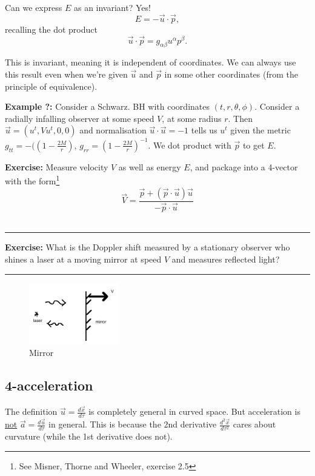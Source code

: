 \documentclass[a4paper]{article} %
\newcommand{\exercise}[2]
{
\begin{framed}
\textbf{Exercise:} #1 \\\hrule
#2
\end{framed}
}
\newcommand{\example}[2]
{
\begin{framed}
\textbf{Example #1:} #2
\end{framed}
}
\begin{document}
Can we express $E$ as an invariant? Yes!
\begin{equation}
E=-\vec{u}\cdot\vec{p},
\end{equation}
recalling the dot product
\begin{equation}
\vec{u}\cdot\vec{p}=g_{\alpha\beta}u^{\alpha}p^{\beta}.
\end{equation}


This is invariant, meaning it is independent of coordinates. We can always use this result even when we're given $\vec{u}$ and $\vec{p}$ in some other coordinates (from the principle of equivalence).

\example{?}{Consider a Schwarz. BH with coordinates $(t,r,\theta,\phi)$. Consider a radially infalling observer at some speed $V$, at some radius $r$. Then $\vec{u}=(u^t,Vu^t,0,0)$ and normalisation $\vec{u}\cdot\vec{u}=-1$ tells us $u^t$ given the metric $g_{tt}=-(\left(1-\frac{2M}{r}\right)$, $g_{rr}=\left(1-\frac{2M}{r}\right)^{-1}$. We dot product with $\vec{p}$ to get $E$.}

\exercise{Measure velocity $V$ as well as energy $E$, and package into a 4-vector with the form\footnote{See Misner, Thorne and Wheeler, exercise 2.5}
\begin{equation}
\vec{V}=\frac{\vec{p}+(\vec{p}\cdot\vec{u})\vec{u}}{-\vec{p}\cdot\vec{u}}
\end{equation}
}{}

\exercise{What is the Doppler shift measured by a stationary observer who shines a laser at a moving mirror at speed $V$ and measures reflected light?
}{}
\begin{figure}[h]
\centering
\includegraphics[width=0.35\textwidth]{images/mirror.png}
\caption{Mirror}
\end{figure}

\subsection{4-acceleration}
The definition $\vec{u}=\frac{d\vec{x}}{d\tau}$ is completely general in curved space. But acceleration is \underline{not} $\vec{a}=\frac{d\vec{u}}{d\tau}$ in general. This is because the 2nd derivative $\frac{d^2\vec{x}}{d\tau^2}$ cares about curvature (while the 1st derivative does not).
\end{document}
